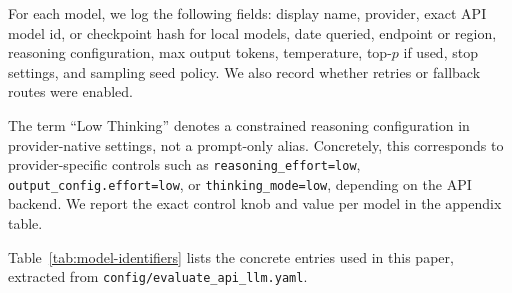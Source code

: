 For each model, we log the following fields: display name, provider, exact API model id, or checkpoint hash for local models, date queried, endpoint or region, reasoning configuration, max output tokens, temperature, top-$p$ if used, stop settings, and sampling seed policy. We also record whether retries or fallback routes were enabled.

The term ``Low Thinking'' denotes a constrained reasoning configuration in provider-native settings, not a prompt-only alias. Concretely, this corresponds to provider-specific controls such as \texttt{reasoning\_effort=low}, \texttt{output\_config.effort=low}, or \texttt{thinking\_mode=low}, depending on the API backend. We report the exact control knob and value per model in the appendix table.

Table~\ref{tab:model-identifiers} lists the concrete entries used in this paper, extracted from \texttt{config/evaluate\_api\_llm.yaml}.

